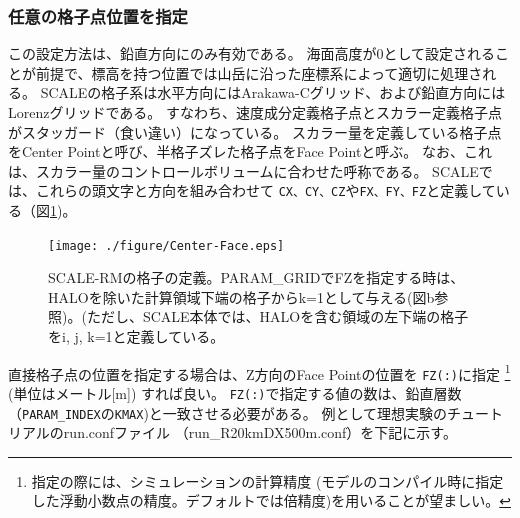 \subsubsection{任意の格子点位置を指定}
この設定方法は、鉛直方向にのみ有効である。
海面高度が0として設定されることが前提で、標高を持つ位置では山岳に沿った座標系によって適切に処理される。
SCALEの格子系は水平方向にはArakawa-Cグリッド、および鉛直方向にはLorenzグリッドである。
すなわち、速度成分定義格子点とスカラー定義格子点がスタッガード（食い違い）になっている。
スカラー量を定義している格子点をCenter Pointと呼び、半格子ズレた格子点をFace Pointと呼ぶ。
なお、これは、スカラー量のコントロールボリュームに合わせた呼称である。
SCALEでは、これらの頭文字と方向を組み合わせて
\verb|CX、CY、CZ|や\verb|FX、FY、FZ|と定義している（図\ref{fig:scale_grid})。


\begin{figure}[h]
\begin{center}
  \texttt{[image: ./figure/Center-Face.eps]}\\
  \caption{SCALE-RMの格子の定義。PARAM\_GRIDでFZを指定する時は、HALOを除いた計算領域下端の格子からk=1として与える(図b参照)。(ただし、SCALE本体では、HALOを含む領域の左下端の格子をi, j, k=1と定義している。}
  \label{fig:scale_grid}
\end{center}
\end{figure}



直接格子点の位置を指定する場合は、Z方向のFace Pointの位置を
\verb|FZ(:)|に指定
\footnote{指定の際には、シミュレーションの計算精度
(モデルのコンパイル時に指定した浮動小数点の精度。デフォルトでは倍精度)を用いることが望ましい。}
(単位はメートル[m]) すれば良い。
\verb|FZ(:)|で指定する値の数は、鉛直層数（\verb|PARAM_INDEX|の\verb|KMAX|)と一致させる必要がある。
例として理想実験のチュートリアルのrun.confファイル
（run\_R20kmDX500m.conf）を下記に示す。\\

